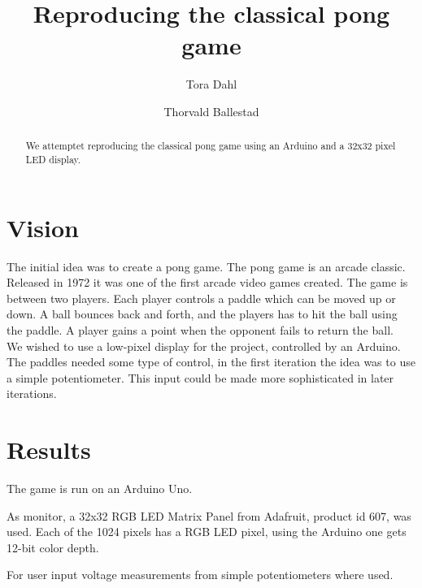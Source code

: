 \documentclass{article}
\author{Tora Dahl}
\author{Thorvald Ballestad}
\title{Reproducing the classical pong game}
\begin{document}
\maketitle

\begin{abstract}
  We attemptet reproducing the classical pong game using an Arduino and a 32x32 pixel LED display.
\end{abstract}

\section{Vision}
The initial idea was to create a pong game.
The pong game is an arcade classic.
Released in 1972 it was one of the first arcade video games created.
The game is between two players.
Each player controls a paddle which can be moved up or down.
A ball bounces back and forth, and the players has to hit the ball using the paddle.
A player gains a point when the opponent fails to return the ball.\\

We wished to use a low-pixel display for the project, controlled by an Arduino.
The paddles needed some type of control, in the first iteration the idea was to use a simple potentiometer.
This input could be made more sophisticated in later iterations.

\section{Results}
The game is run on an Arduino Uno.

As monitor, a 32x32 RGB LED Matrix Panel from Adafruit, product id 607, was used.
Each of the 1024 pixels has a RGB LED pixel, using the Arduino one gets 12-bit color depth.

For user input voltage measurements from simple potentiometers where used.
\end{document}

